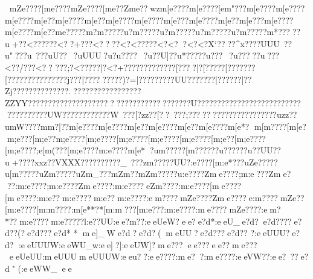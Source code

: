 {{{{{{{{{{{{{{{{{{{{{{{{{{{{{{{{{{{{{{{{{{{{{{{{{{{{{{{{{{{{{{{{{{{{{{{{{{{{{{{{{{{{{{{{{{{{{{{{{{{{{{{{{{{{{{{{{{{{{{{{{{{{{{{{{{{{{{{{{{{{{{{{{{{{{{{{{{{{{{{{{{{{{{{{{{{{{{{{{{{{{{{{{{{{{{{{{{{{{{{{{{{{{{{{{{{{{{{{{{{{{{{{{{{{{{{{{{{{{{{{{{{{{{{{{{{{{{{{{{{{{{{{{{{{{{{{{{{{{{{{{{{{{{{{{{{{{{{{{{{{{{{{{{{{{{{{{{{{{{{{{{{{{{{{{{{{{{{{{{{{{{{{{{{{{{{{{{{{{{{{{{{{{{{{{{{{{{{{{{{{{{{{{{{{{{{{{{{{{{{{{{{{{{{{{{{{{{{{{{{{{{{{{{{{{{{{{{{{{{{{{{{{{{{{{{{{{{{{{{{{{{{{{{{{{{{{{{{{{{{{{{{{{{{{{{{{{{{{{{{{{{{{{{{{{{{{{{{{{{{{{{{{{{{{{{{{{{{{{{{{{{{{{{{{{{{{{{{{{{{{{{{{{{{{{{{{{{{{{{{{{{{{{{{{{{{{{{{{{{{{{{{{{{{{{{{{{{{{{{{{{{{{{{{{{{{{{{{{{{{{{{{{{{{{{{{{{{{{{{{{{{{{{{{{{{{{{{{{{{{{{{{{{{{{{{{{{{{{{{{{{{{{{{{{{{{{{{{{{{{{{{{{{{{{{{{{{{{{{{{{{{{{{{{{{{{{{{{{{{{{{{{{{{{{{{{{{{{{{{{mZe????[m{e????{mZe????[m{e??Zm{e??wzm[e????{m[e????[e{m"???{m[e????{m[e????{m[e????{m[e??{m[e????{m[e??{m[e????{m[e????{m[e???{m[e????{m[e??{m[e???{m[e????{m[e????{m[e??{m{e?????m?m?????u?m?????u?m?????u?m?????u?m????}?m*?????u+??<??}????<??+???<?? ??<?<?????<?<? ?<?<?X`????}^x????}UUU~?}?u" ??}?u~?  ?}?uU??~?uUUU?u?u????~?u??U]?}?u*????}?u ???~?u????}?u???<??}/???<??
???;?<?????|?<?+???{?\?????{?\?????\?[????|?[?????[?{?????{?[???????{???????{?j???|?{??????{??)?=|?{???????{?UU??{?{???? |?{?????|?{?Zj????{???????{???.??????? ??????????ZZYY??????????????????????????  ??????   ???????U????????????????????????????????????UW???????? ????W~???[?zz??[??~???;???????}???????}???????uzz??u{mW????m{m?|??m[e????{m[e????{m[e??{m[e????{m[e??{m[e????{m[e*?
{m[m????[m[e?  {m;e???[m;e??{m;e????[m;e????[m;e????[m;e????[m;e????[m;e??[m;e????[m;e????;e[m(???[m;e????{m:e????{m[e* ?u{m?????}[m?????}?u??????u??UU??u +???}?xxz?}?VXXX??????????}_~???zm??? ??}UU?}:e????[m:e*???{uZe?????u[m?????uZm?????uZm_???{mZm??{mZm?????u:e????Zme????;m:e???Zme???:m:e????;m:e????Zme????:m:e????eZm????:m:e????[me????[me????:m:e??m:e????m:e??m:e????:em????mZe????Zme????e:m????mZe??[m:e????[m:m????:m[e**?*[m:m???[m:e???:m:e????:me????mZe????:em?*??m:e????m:e?????l:e??UU:ee?m??:eeUeW?ee?   e?d*   :ee}U}_e?d?  e?d????e?d??(?e?d??? e?d*
*me]_We?d ? e?d?(meUU?e?d ???e?d??
?:eeUUU?e?d?  :eeUUUW:eeWU_w:ee]?]:eeUW]?me???ee??? ee??  me???eeUeUU:meUUU}meUUUW:eeu??:ee????:me??:me????:eeVW??:ee?~??e?d"
(:eeWW_ee 
}}}}}}}}}}}}}}}}}}}}}}}}}}}}}}}}}}}}}}}}}}}}}}}}}}}}}}}}}}}}}}}}}}}}}}}}}}}}}}}}}}}}}}}}}}}}}}}}}}}}}}}}}}}}}}}}}}}}}}}}}}}}}}}}}}}}}}}}}}}}}}}}}}}}}}}}}}}}}}}}}}}}}}}}}}}}}}}}}}}}}}}}}}}}}}}}}}}}}}}}}}}}}}}}}}}}}}}}}}}}}}}}}}}}}}}}}}}}}}}}}}}}}}}}}}}}}}}}}}}}}}}}}}}}}}}}}}}}}}}}}}}}}}}}}}}}}}}}}}}}}}}}}}}}}}}}}}}}}}}}}}}}}}}}}}}}}}}}}}}}}}}}}}}}}}}}}}}}}}}}}}}}}}}}}}}}}}}}}}}}}}}}}}}}}}}}}}}}}}}}}}}}}}}}}}}}}}}}}}}}}}}}}}}}}}}}}}}}}}}}}}}}}}}}}}}}}}}}}}}}}}}}}}}}}}}}}}}}}}}}}}}}}}}}}}}}}}}}}}}}}}}}}}}}}}}}}}}}}}}}}}}}}}}}}}}}}}}}}}}}}}}}}}}}}}}}}}}}}}}}}}}}}}}}}}}}}}}}}}}}}}}}}}}}}}}}}}}}}}}}}}}}}}}}}}}}}}}}}}}}}}}}}}}}}}}}}}}}}}}}}}}}}}}}}}}}}}}}}}}}}}}}}}}}}}}}}}}}}}}}}}}}}}}}}}}}}}}}}}}}}}}}}}}}}}}}}}}}}}}}}}}}}}}}}}}}}}}}}}}}}}}}}}}}}}}}}}}}}}}}}}}}}}}}}}}}}}}}}}}}}}}}}}}}}}}}}}}}}}}}}}}}}}}}}}}}
